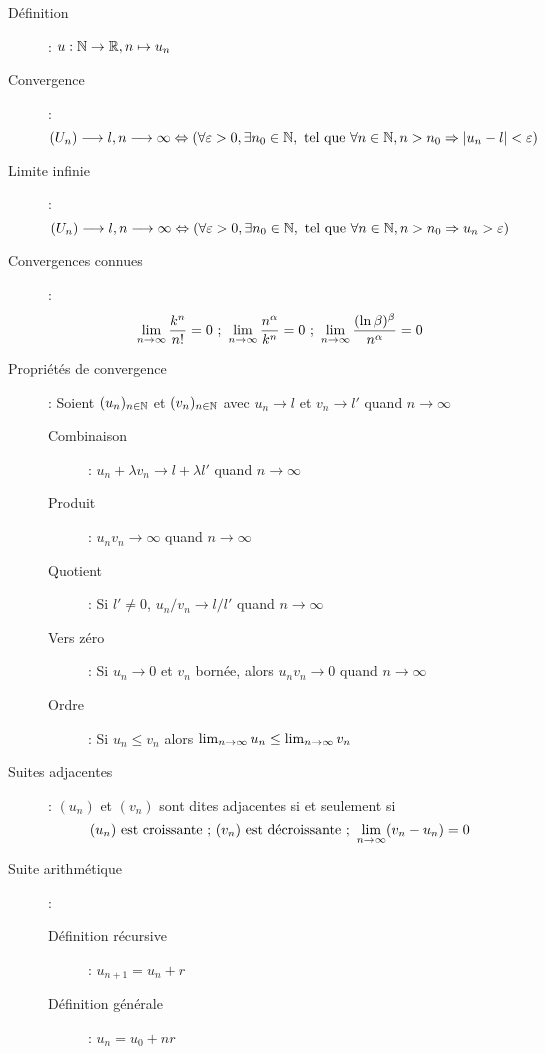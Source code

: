 \begin{description}
\item[Définition] : $u:\mathbb{N}\rightarrow\mathbb{R},n\mapsto u_n$
\item[Convergence] : 
    \[(U_n)\longrightarrow l, n\longrightarrow\infty
    \Leftrightarrow \left(
        \forall\varepsilon>0,
        \exists n_0\in\mathbb{N},
        \textrm{ tel que }\forall n\in\mathbb{N}, n>n_0\Rightarrow
        |u_n-l|<\varepsilon
    \right)\]
\item[Limite infinie] : 
    \[(U_n)\longrightarrow l, n\longrightarrow\infty
    \Leftrightarrow \left(
        \forall\varepsilon>0,
        \exists n_0\in\mathbb{N},
        \textrm{ tel que }\forall n\in\mathbb{N}, n>n_0\Rightarrow
        u_n>\varepsilon
    \right)\]
\item[Convergences connues] : 
    \[
        \lim_{n\rightarrow\infty}\frac{k^n}{n!} = 0
        \textrm{ ; }
        \lim_{n\rightarrow\infty}\frac{n^\alpha}{k^n} = 0
        \textrm{ ; }
        \lim_{n\rightarrow\infty}\frac{(\ln\beta)^\beta}{n^\alpha}=0
    \]
\item[Propriétés de convergence] : Soient $(u_n)_{n\in\mathbb{N}}$ et $(v_n)_{n\in\mathbb{N}}$
    avec $u_n\longrightarrow l$ et $v_n\longrightarrow l'$ quand $n\longrightarrow\infty$
    \begin{description}
    \item[Combinaison] : $u_n+\lambda v_n\longrightarrow l+\lambda l'$ quand $n\longrightarrow\infty$
    \item[Produit] : $u_nv_n\longrightarrow\infty$ quand $n\longrightarrow\infty$
    \item[Quotient] : Si $l'\ne 0$, $u_n/v_n\longrightarrow l/l'$ quand $n\longrightarrow\infty$
    \item[Vers zéro] : Si $u_n\longrightarrow 0$ et $v_n$ bornée, alors $u_nv_n\longrightarrow 0$ quand $n\longrightarrow\infty$
    \item[Ordre] : Si $u_n\le v_n$ alors $\lim_{n\rightarrow\infty}u_n\le\lim_{n\rightarrow\infty}v_n$
    \end{description}
\item[Suites adjacentes] : $(u_n)$ et $(v_n)$ sont dites adjacentes si et seulement si
    \[
        (u_n)\textrm{ est croissante ; }
        (v_n)\textrm{ est décroissante ; }
        \lim_{n\rightarrow\infty}(v_n-u_n)=0
    \]
\item[Suite arithmétique] : 
    \begin{description}
    \item[Définition récursive] : $u_{n+1}=u_n+r$
    \item[Définition générale] : $u_n=u_0+nr$

\end{description}
\end{description}
